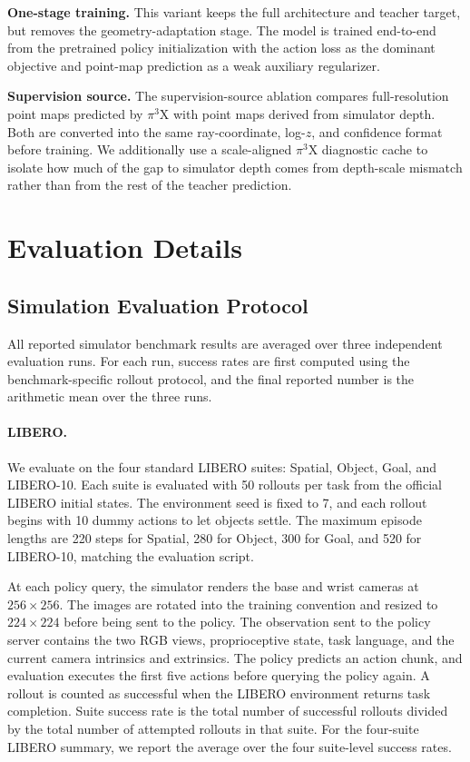 \textbf{One-stage training.}
This variant keeps the full architecture and teacher target, but removes the geometry-adaptation stage. The model is trained end-to-end from the pretrained policy initialization with the action loss as the dominant objective and point-map prediction as a weak auxiliary regularizer.

\textbf{Supervision source.}
The supervision-source ablation compares full-resolution point maps predicted by $\pi^3$X with point maps derived from simulator depth. Both are converted into the same ray-coordinate, log-$z$, and confidence format before training. We additionally use a scale-aligned $\pi^3$X diagnostic cache to isolate how much of the gap to simulator depth comes from depth-scale mismatch rather than from the rest of the teacher prediction.

\section{Evaluation Details}
\label{app:evaluation_details}
\subsection{Simulation Evaluation Protocol} 
\label{app:simulation_protocol}
All reported simulator benchmark results are averaged over three independent evaluation runs.
For each run, success rates are first computed using the benchmark-specific rollout protocol, and
the final reported number is the arithmetic mean over the three runs.
\paragraph{LIBERO.}
We evaluate on the four standard LIBERO suites: Spatial, Object, Goal, and LIBERO-10. Each suite is evaluated with 50 rollouts per task from the official LIBERO initial states. The environment seed is fixed to 7, and each rollout begins with 10 dummy actions to let objects settle. The maximum episode lengths are 220 steps for Spatial, 280 for Object, 300 for Goal, and 520 for LIBERO-10, matching the evaluation script.

At each policy query, the simulator renders the base and wrist cameras at $256\times256$. The images are rotated into the training convention and resized to $224\times224$ before being sent to the policy. The observation sent to the policy server contains the two RGB views, proprioceptive state, task language, and the current camera intrinsics and extrinsics. The policy predicts an action chunk, and evaluation executes the first five actions before querying the policy again. A rollout is counted as successful when the LIBERO environment returns task completion. Suite success rate is the total number of successful rollouts divided by the total number of attempted rollouts in that suite. For the four-suite LIBERO summary, we report the average over the four suite-level success rates.

